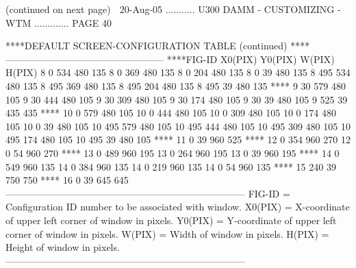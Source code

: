                     (continued on next page)
    
   20-Aug-05 ........... U300  DAMM - CUSTOMIZING - WTM ............. PAGE  40
 
   ****DEFAULT SCREEN-CONFIGURATION TABLE (continued)
   ****--------------------------------------------------
   ****FIG-ID   X0(PIX)   Y0(PIX)    W(PIX)    H(PIX)
            8         0       534       480       135
            8         0       369       480       135
            8         0       204       480       135
            8         0        39       480       135
            8       495       534       480       135
            8       495       369       480       135
            8       495       204       480       135
            8       495        39       480       135
   ****
            9        30       579       480       105
            9        30       444       480       105
            9        30       309       480       105
            9        30       174       480       105
            9        30        39       480       105
            9       525        39       435       435
   ****
           10         0       579       480       105
           10         0       444       480       105
           10         0       309       480       105
           10         0       174       480       105
           10         0        39       480       105
           10       495       579       480       105
           10       495       444       480       105
           10       495       309       480       105
           10       495       174       480       105
           10       495        39       480       105
   ****
           11         0        39       960       525
   ****
           12         0       354       960       270
           12         0        54       960       270
   ****
           13         0       489       960       195
           13         0       264       960       195
           13         0        39       960       195
   ****
           14         0       549       960       135
           14         0       384       960       135
           14         0       219       960       135
           14         0        54       960       135
   ****
           15       240        39       750       750
   ****
           16         0        39       645       645
   ---------------------------------------------------------------------------
   FIG-ID  = Configuration ID number to be associated with window.
   X0(PIX) = X-coordinate of upper left corner of window in pixels.
   Y0(PIX) = Y-coordinate of upper left corner of window in pixels.
   W(PIX)  = Width  of window in pixels.
   H(PIX)  = Height of window in pixels.
   ---------------------------------------------------------------------------
 
